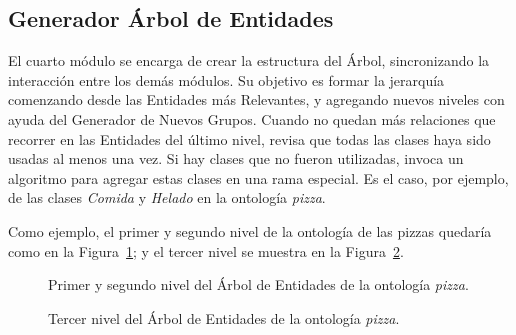 
\subsection{Generador Árbol de Entidades}
El cuarto módulo se encarga de crear la estructura del Árbol, sincronizando la interacción entre los demás módulos. Su objetivo es formar la jerarquía comenzando desde las Entidades más Relevantes, y agregando nuevos niveles con ayuda del Generador de Nuevos Grupos. Cuando no quedan más relaciones que recorrer en las Entidades del último nivel, revisa que todas las clases haya sido usadas al menos una vez. Si hay clases que no fueron utilizadas, invoca un algoritmo para agregar estas clases en una rama especial. Es el caso, por ejemplo, de las clases \emph{Comida} y \emph{Helado} en la ontología \emph{pizza}.

Como ejemplo, el primer y segundo nivel de la ontología de las pizzas quedaría como en la Figura~\ref{fig:macro_planning_pizza}; y el tercer nivel se muestra en la Figura~\ref{fig:macro_planning_pizza_n2}.

\begin{figure}
\centering
\begin{minipage}[c]{0.7\textwidth}
{\footnotesize 
{}}
\caption{Primer y segundo nivel del Árbol de Entidades de la ontología \emph{pizza}.}
\label{fig:macro_planning_pizza}
\end{minipage}
\end{figure}

\begin{figure}
\centering
\begin{minipage}[c]{0.7\textwidth}
{\footnotesize 
{}}
\caption{Tercer nivel del Árbol de Entidades de la ontología \emph{pizza}.}
\label{fig:macro_planning_pizza_n2}
\end{minipage}
\end{figure}


